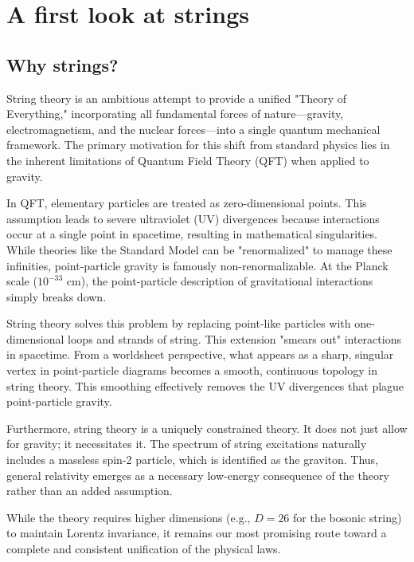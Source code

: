 \setcounter{section}{0}%

\setcounter{chapter}{0}

\chapter{\texorpdfstring{A first look at strings}{1 A first look at strings}} \label{cha:1} 

\section{\texorpdfstring{Why strings?}{Why strings?}}
String theory is an ambitious attempt to provide a unified "Theory of Everything," incorporating all fundamental forces of nature—gravity, electromagnetism, and the nuclear forces—into a single quantum mechanical framework. The primary motivation for this shift from standard physics lies in the inherent limitations of Quantum Field Theory (QFT) when applied to gravity.

In QFT, elementary particles are treated as zero-dimensional points. This assumption leads to severe ultraviolet (UV) divergences because interactions occur at a single point in spacetime, resulting in mathematical singularities. While theories like the Standard Model can be "renormalized" to manage these infinities, point-particle gravity is famously non-renormalizable. At the Planck scale ($10^{-33}$ cm), the point-particle description of gravitational interactions simply breaks down.


String theory solves this problem by replacing point-like particles with one-dimensional loops and strands of string. This extension "smears out" interactions in spacetime. From a worldsheet perspective, what appears as a sharp, singular vertex in point-particle diagrams becomes a smooth, continuous topology in string theory. This smoothing effectively removes the UV divergences that plague point-particle gravity.

Furthermore, string theory is a uniquely constrained theory. It does not just allow for gravity; it necessitates it. The spectrum of string excitations naturally includes a massless spin-2 particle, which is identified as the graviton. Thus, general relativity emerges as a necessary low-energy consequence of the theory rather than an added assumption. 

While the theory requires higher dimensions (e.g., $D=26$ for the bosonic string) to maintain Lorentz invariance, it remains our most promising route toward a complete and consistent unification of the physical laws.

